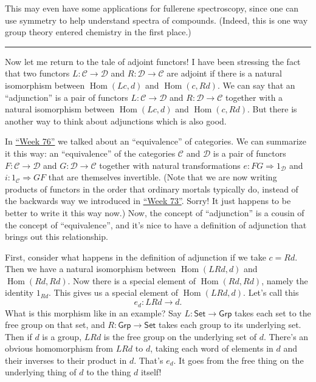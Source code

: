 \documentclass{article}
\begin{document}
This may even have some applications for fullerene spectroscopy, since
one can use symmetry to help understand spectra of compounds. (Indeed,
this is one way group theory entered chemistry in the first place.)

\begin{center}\rule{0.5\linewidth}{0.5pt}\end{center}

Now let me return to the tale of adjoint functors! I have been stressing
the fact that two functors \(L\colon\mathcal{C}\to\mathcal{D}\) and
\(R\colon\mathcal{D}\to\mathcal{C}\) are adjoint if there is a natural
isomorphism between \(\operatorname{Hom}(Lc,d)\) and
\(\operatorname{Hom}(c,Rd)\). We can say that an ``adjunction'' is a
pair of functors \(L\colon\mathcal{C}\to\mathcal{D}\) and
\(R\colon\mathcal{D}\to\mathcal{C}\) together with a natural isomorphism
between \(\operatorname{Hom}(Lc,d)\) and \(\operatorname{Hom}(c,Rd)\).
But there is another way to think about adjunctions which is also good.

In \protect\hyperlink{week76}{``Week 76''} we talked about an
``equivalence'' of categories. We can summarize it this way: an
``equivalence'' of the categories \(\mathcal{C}\) and \(\mathcal{D}\) is
a pair of functors \(F\colon\mathcal{C}\to\mathcal{D}\) and
\(G\colon\mathcal{D}\to\mathcal{C}\) together with natural
transformations \(e: FG \Rightarrow 1_\mathcal{D}\) and
\(i\colon 1_\mathcal{C} \Rightarrow GF\) that are themselves invertible.
(Note that we are now writing products of functors in the order that
ordinary mortals typically do, instead of the backwards way we
introduced in \protect\hyperlink{week73}{``Week 73''}. Sorry! It just
happens to be better to write it this way now.) Now, the concept of
``adjunction'' is a cousin of the concept of ``equivalence'', and it's
nice to have a definition of adjunction that brings out this
relationship.

First, consider what happens in the definition of adjunction if we take
\(c = Rd\). Then we have a natural isomorphism between
\(\operatorname{Hom}(LRd,d)\) and \(\operatorname{Hom}(Rd,Rd)\). Now
there is a special element of \(\operatorname{Hom}(Rd,Rd)\), namely the
identity \(1_{Rd}\). This gives us a special element of
\(\operatorname{Hom}(LRd,d)\). Let's call this \[e_d\colon LRd \to d.\]
What is this morphism like in an example? Say
\(L\colon\mathsf{Set}\to\mathsf{Grp}\) takes each set to the free group
on that set, and \(R\colon\mathsf{Grp}\to\mathsf{Set}\) takes each group
to its underlying set. Then if \(d\) is a group, \(LRd\) is the free
group on the underlying set of \(d\). There's an obvious homomorphism
from \(LRd\) to \(d\), taking each word of elements in \(d\) and their
inverses to their product in \(d\). That's \(e_d\). It goes from the
free thing on the underlying thing of \(d\) to the thing \(d\) itself!
\end{document}
